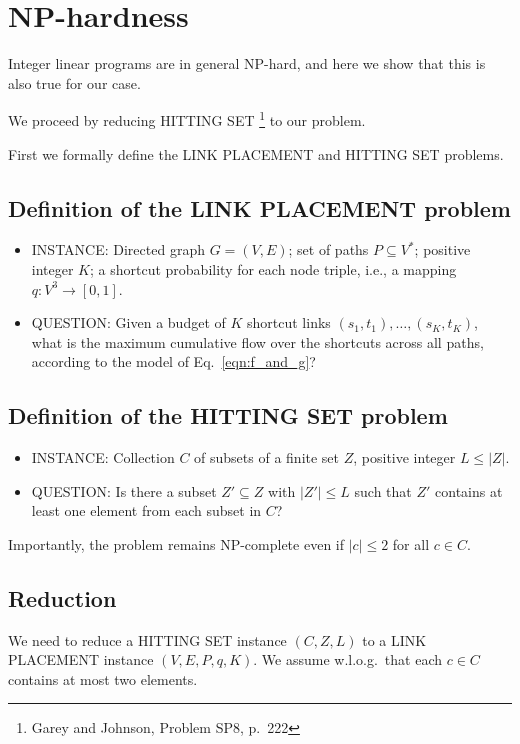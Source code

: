 \documentclass[11pt,letterpaper]{article}
\begin{document}
\section{NP-hardness}

Integer linear programs are in general NP-hard, and here we show that this is also true for our case.

We proceed by reducing HITTING SET%
\footnote{Garey and Johnson, Problem SP8, p.~222}
to our problem.

First we formally define the LINK PLACEMENT and HITTING SET problems.

\subsection{Definition of the LINK PLACEMENT problem}

\begin{itemize}
\item INSTANCE: Directed graph $G=(V,E)$;
set of paths $P \subseteq V^*$;
positive integer $K$;
a shortcut probability for each node triple, i.e., a mapping $q : V^3 \rightarrow [0,1]$.
\item QUESTION: Given a budget of $K$ shortcut links $(s_1,t_1), \dots, (s_K,t_K)$, what is the maximum cumulative flow over the shortcuts across all paths, according to the model of Eq.~\ref{eqn:f_and_g}?
\end{itemize}

\subsection{Definition of the HITTING SET problem}

\begin{itemize}
\item INSTANCE: Collection $C$ of subsets of a finite set $Z$, positive integer $L \leq |Z|$.
\item QUESTION: Is there a subset $Z' \subseteq Z$ with $|Z'| \leq L$ such that $Z'$ contains at least one element from each subset in $C$?
\end{itemize}

Importantly, the problem remains NP-complete even if $|c| \leq 2$ for all $c \in C$.

\subsection{Reduction}

We need to reduce a HITTING SET instance $(C,Z,L)$ to a LINK PLACEMENT instance $(V,E,P,q,K)$.
We assume w.l.o.g.\ that each $c \in C$ contains at most two elements.
\end{document}
